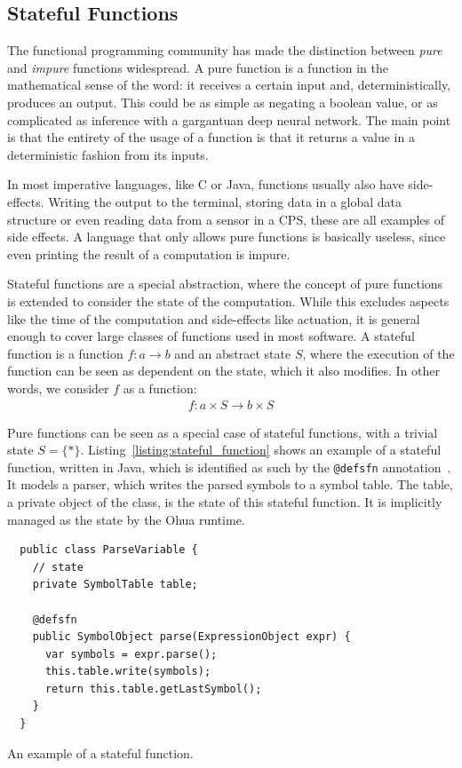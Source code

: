 \subsection{Stateful Functions}
The functional programming community has made the distinction between \emph{pure} and \emph{impure} functions widespread.
A pure function is a function in the mathematical sense of the word: it receives a certain input and, deterministically, produces an output.
This could be as simple as negating a boolean value, or as complicated as inference with a gargantuan deep neural network.
The main point is that the entirety of the usage of a function is that it returns a value in a deterministic fashion from its inputs.

In most imperative languages, like C or Java, functions usually also have side-effects. Writing the output to the terminal, storing data in a global data structure or even reading data from a sensor in a \ac{CPS}, these are all examples of side effects.
A language that only allows pure functions is basically useless, since even printing the result of a computation is impure.

Stateful functions are a special abstraction, where the concept of pure functions is extended to consider the state of the computation. 
While this excludes aspects like the time of the computation and side-effects like actuation, it is general enough to cover large classes of functions used in most software.
A stateful function is a function $f : a \rightarrow b$ and an abstract state $S$, where the execution of the function can be seen as dependent on the state, which it also modifies.
In other words, we consider $f$ as a function:
\begin{align}
  f : a \times S \rightarrow b \times S \label{eqn:state_thread}
\end{align}

Pure functions can be seen as a special case of stateful functions, with a trivial state $S = \{*\}$.
Listing~\ref{listing:stateful_function} shows an example of a stateful function, written in Java, which is identified as such by the \texttt{@defsfn} annotation~\cite{ertel_pmam18}.
It models a parser, which writes the parsed symbols to a symbol table.
The table, a private object of the class, is the state of this stateful function.
It is implicitly managed as the state by the Ohua runtime.

\begin{listing}
\begin{verbatim}
  public class ParseVariable {
    // state
    private SymbolTable table;
  
    @defsfn
    public SymbolObject parse(ExpressionObject expr) {
      var symbols = expr.parse();
      this.table.write(symbols);
      return this.table.getLastSymbol();
    }
  }
\end{verbatim}
\caption{An example of a stateful function.}
\label{listing:stateful_function}
\end{listing}